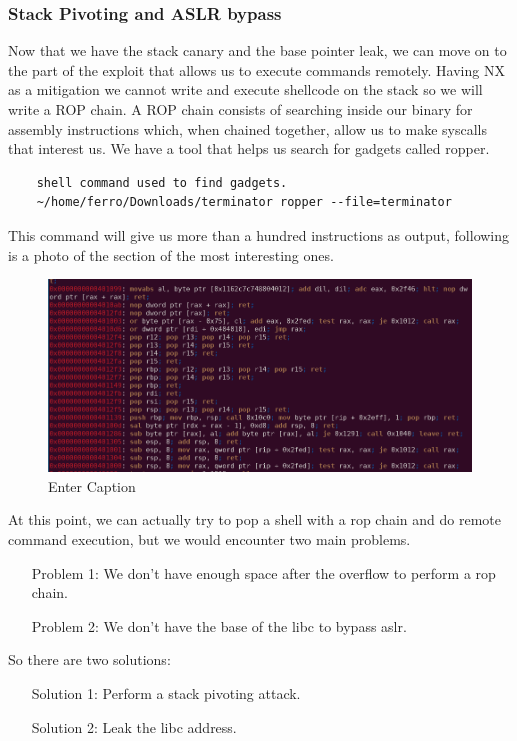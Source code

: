     \subsubsection{Stack Pivoting and ASLR bypass}
    Now that we have the stack canary and the base pointer leak, we can move on to the part of the exploit that allows us to execute commands remotely.\newline
    Having NX as a mitigation we cannot write and execute shellcode on the stack so we will write a ROP chain.
    A ROP chain consists of searching inside our binary for assembly instructions which, when chained together, allow us to make syscalls that interest us.\newline
    \clearpage
    We have a tool that helps us search for gadgets called ropper.\newline
    \begin{verbatim}
    shell command used to find gadgets.
    ~/home/ferro/Downloads/terminator ropper --file=terminator
    \end{verbatim}
    This command will give us more than a hundred instructions as output, following is a photo of the section of the most interesting ones.\newline
    \begin{figure}[htbp]
        \centering
        \includegraphics[width=1\linewidth]{Images/rop_gadget.png}
        \caption{Enter Caption}
        \label{fig:enter-label}
    \end{figure}
    
    At this point, we can actually try to pop a shell with a rop chain and do remote command execution, but we would encounter two main problems.\newline
    \begin{itemize}
        \item[Problem 1:] We don't have enough space after the overflow to perform a rop chain.
        \item[Problem 2:] We don't have the base of the libc to bypass aslr.
    \end{itemize}
    So there are two solutions: \newline
    \begin{itemize}
        \item[Solution 1:] Perform a stack pivoting attack.
        \item[Solution 2:] Leak  the libc address.
    \end{itemize}
    \clearpage
